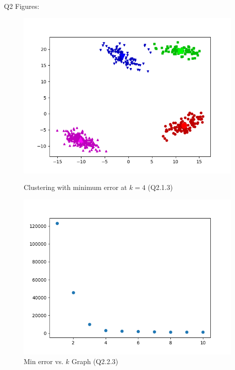 \documentclass{article}
\begin{document}
Q2 Figures:
\begin{figure}
    \includegraphics[width=30em]{a2_q2_1_3.png}
    \caption{Clustering with minimum error at $k=4$ (Q2.1.3)}
    \label{fig:q2_1_3}

    \includegraphics[width=30em]{a2_q2_2_3.png}
    \caption{Min error vs. $k$ Graph (Q2.2.3)}
    \label{fig:q2_2_3}
\end{figure}
\end{document}
